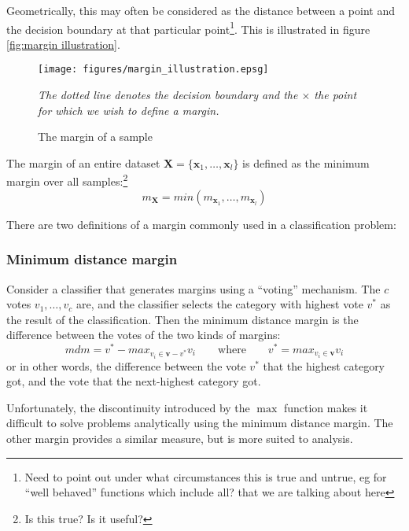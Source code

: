 Geometrically, this may often be considered as the distance between a
point and the decision boundary at that particular point\footnote{Need
to point out under what circumstances this is true and untrue, eg for
``well behaved'' functions which include all? that we are talking
about here}.  This is illustrated in figure \ref{fig:margin
illustration}.

\begin{figure}
\begin{center}
\texttt{[image: figures/margin\_illustration.epsg]}
\end{center}
\caption{The margin of a sample}
\emph{The dotted line denotes the decision boundary and the $\times$ the
point for which we wish to define a margin.}
\label{fig:margin illustration}
\end{figure}

The margin of an entire dataset $\mathbf{X} = \{ \mathbf{x}_1, \ldots,
\mathbf{x}_l \}$ is defined as the minimum margin over all
samples:\footnote{Is this true?  Is it useful?}
%
\begin{equation}
m_{\mathbf{X}} = min \left( m_{\mathbf{x}_1}, \ldots, m_{\mathbf{x}_l}
\right)
\label{eqn:dataset margin}
\end{equation}
%

There are two definitions of a margin commonly used in a
classification problem:

\subsubsection{Minimum distance margin}
Consider a classifier that generates margins using a ``voting''
mechanism.  The $c$ votes $v_1, \ldots, v_c$ are, and the classifier
selects the category with highest vote $v^{\ast}$ as the result of the
classification.   Then the minimum distance margin is the difference
between the votes of the two kinds of margins:
%
\begin{equation}
mdm = v^{\ast} - max_{v_i \in \mathbf{v} - v^{\ast}} v_i \qquad
\mbox{where} \qquad v^{\ast} = max_{v_i \in \mathbf{v}} v_i
\end{equation}
%
or in other words, the difference between the vote $v^{\ast}$ that the
highest category got, and  the vote that the next-highest category
got.

Unfortunately, the discontinuity introduced by the $\max$ function
makes it difficult to solve
problems analytically using the minimum distance margin.  The other
margin provides a similar measure, but is more suited to analysis.

